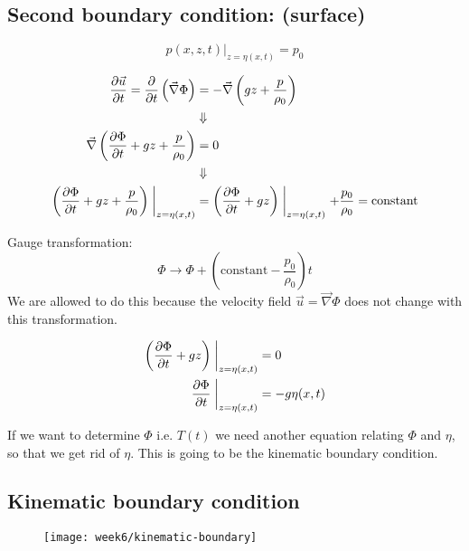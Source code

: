 \subsection{Second boundary condition: (surface)}
\begin{equation}
p(x,z,t)|_{z=\eta(x,t)} = p_0
\end{equation}

\begin{align}
\frac{\partial \vec{u}}{\partial t} = \frac{\partial }{\partial t}\left(\vec{\nabla}\Phi\right) &= -\vec{\nabla}\left(gz+\frac{p}{\rho_0}\right) \\
&\Downarrow\notag\\
\vec{\nabla}\left(\frac{\partial \Phi}{\partial t}+gz+\frac{p}{\rho_0}\right)&=0\\
&\Downarrow\notag\\
\left(\frac{\partial \Phi}{\partial t}+gz+\frac{p}{\rho_0}\right)\biggm\vert_{z=\eta(x,t)} &= \left(\frac{\partial \Phi}{\partial t}+gz\right)\biggm\vert_{z=\eta(x,t)} + \frac{p_0}{\rho_0} = \mathrm{constant}
\end{align}

Gauge transformation:
\begin{equation}
\Phi \rightarrow \Phi + \left(\mathrm{constant}-\frac{p_0}{\rho_0}\right)t
\end{equation}
We are allowed to do this because the velocity field $\vec{u}=\vec{\nabla}\Phi$ does not change with this transformation.

\begin{align}
\left(\frac{\partial \Phi}{\partial t}+gz\right)\biggm\vert_{z=\eta(x,t)}&=0\\
\frac{\partial \Phi}{\partial t}\biggm\vert_{z=\eta(x,t)} &= -g\eta(x,t)\label{eq:surface-phi-eta}
\end{align}

If we want to determine $\Phi$ i.e. $T(t)$ we need another equation relating $\Phi$ and $\eta$, so that we get rid of $\eta$. This is going to be the kinematic boundary condition.

\newpage
\subsection{Kinematic boundary condition}

\begin{figure}[!h]
    \centering
    \texttt{[image: week6/kinematic-boundary]}\\
    \caption{}
    \label{fig:kinematic-boundary}
\end{figure}

